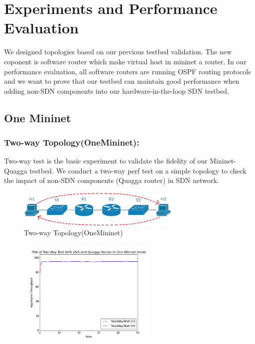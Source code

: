 \section{Experiments and Performance Evaluation}\label{performance-evaluation}

We designed topologies based on our previous testbed validation. The new
coponent is software router which make virtual host in mininet a router.
In our performance evaluation, all software routers are running OSPF
routing protocols and we want to prove that our testbed can maintain
good performance when adding non-SDN components into our
hardware-in-the-loop SDN testbed.

\subsection{One Mininet}\label{one-mininet}

\subsubsection{Two-way Topology(OneMininet):}\label{two-way-topologyone-mininet}

Two-way test is the basic experiment to validate the fidelity of our
Mininet-Quagga testbed. We conduct a two-way perf test on a simple
topology to check the impact of non-SDN components (Quagga router) in
SDN network.

\begin{figure}[h]
\centering
\includegraphics[width=0.7\textwidth]{./Figure/OneMininet(SDN+NONSDN)/Twoway/Twoway(OneMininet).png}
\caption{Two-way Topology(OneMininet) \label{fig:Twoway(OneMininet)}}
\end{figure}

\begin{figure}[h]
\centering
\includegraphics[width=0.6\textwidth]{./Figure/OneMininet(SDN+NONSDN)/Twoway/test.png}
\end{figure}


